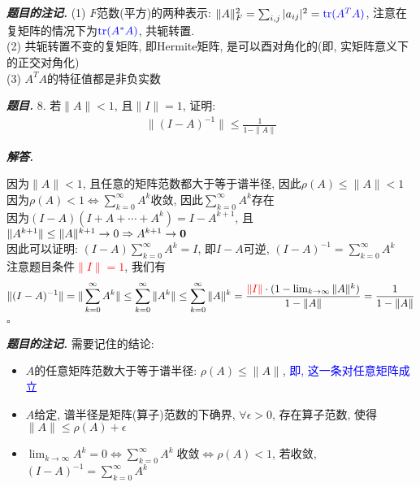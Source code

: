 \documentclass[10pt, a4paper, oneside]{ctexart}
\newcommand{\norm}[1]{\| #1 \|}
\newenvironment{problem}{\begin{framed}\par\noindent\textbf{\textit{题目. }}}{\end{framed}\par}
\newenvironment{solution}{%
  \par\noindent\textbf{\textit{解答. }}\ignorespaces
}{%
  \hfill\ensuremath{\square}\par %
}
\newenvironment{note}{\par\noindent\textbf{\textit{题目的注记. }}\ignorespaces}{\par}
\begin{document}
\begin{note}
(1) $F$范数(平方)的两种表示: $\norm{A}_F^2=\sum_{i,j}|a_{ij}|^2=\textcolor{blue}{\text{tr}(A^TA) }$, 注意在复矩阵的情况下为$\textcolor{blue}{\text{tr}(A^*A)}$, 共轭转置.\\
(2) 共轭转置不变的复矩阵, 即Hermite矩阵, 是可以酉对角化的(即, 实矩阵意义下的正交对角化)\\
(3) $A^TA$的特征值都是非负实数
\end{note}

\begin{problem}
    8. 若$\norm{A}<1$, 且$\norm{I}=1$, 证明:
    \begin{align*}
        \norm{(I-A)^{-1}}\leq \frac{1}{1-\norm{A}}
    \end{align*}
\end{problem}

\begin{solution}
因为$\norm{A}<1$, 且任意的矩阵范数都大于等于谱半径, 因此$\rho(A)\leq \norm{A}<1$\\
因为$\rho(A)<1 \iff \sum_{k=0}^{\infty}A^k$收敛, 因此$ \sum_{k=0}^{\infty}A^k$存在\\
因为$(I-A)(I+A+\cdots+A^k)=I-A^{k+1}$, 且$\norm{A^{k+1}}\leq \norm{A}^{k+1}\to 0 \Rightarrow A^{k+1}\to \bf{0}$\\
因此可以证明: $(I-A)\sum_{k=0}^{\infty}A^k=I$, 即$I-A$可逆, $(I-A)^{-1}=\sum_{k=0}^{\infty}A^k$\\
注意题目条件\textcolor{red}{$\norm{I}=1$}, 我们有
\begin{align*}
    \norm{(I-A)^{-1}}=\norm{\sum_{k=0}^{\infty}A^k}\leq \sum_{k=0}^{\infty}\norm{A^k}\leq \sum_{k=0}^{\infty}\norm{A}^k=\frac{\textcolor{red}{\norm{I}}\cdot(1-\lim_{k\to \infty}\norm{A}^k)}{1-\norm{A}}=\frac{1}{1-\norm{A}}
\end{align*}
\end{solution}
\begin{note}
需要记住的结论:
\begin{itemize}
    \item $A$的任意矩阵范数大于等于谱半径: $\rho(A)\leq \norm{A}$, \textcolor{blue}{即, 这一条对任意矩阵成立}
    \item $A$给定, 谱半径是矩阵(算子)范数的下确界, $\forall \epsilon>0$, 存在算子范数, 使得$\norm{A}\leq \rho(A)+\epsilon$
    \item $\lim_{k\to \infty}A^k=0 \iff \sum_{k=0}^{\infty}A^k \;\text{收敛}\iff \rho(A)<1$, 若收敛, $(I-A)^{-1}=\sum_{k=0}^{\infty}A^k$
\end{itemize}
\end{note}
\end{document}
